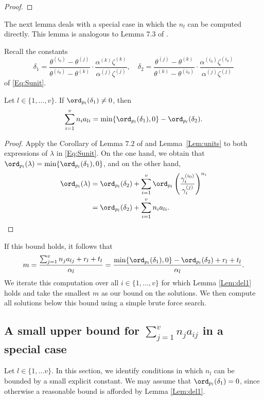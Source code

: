 {\begin{proof}
\end{proof}

The next lemma deals with a special case in which the $n_l$ can be computed directly. This lemma is analogous to Lemma 7.3 of \cite{TW3}. 

Recall the constants
\[\delta_1 = \frac{\theta^{(i_0)} - \theta^{(j)}}{\theta^{(i_0)} - \theta^{(k)}}\cdot\frac{\alpha^{(k)}\zeta^{(k)}}{\alpha^{(j)}\zeta^{(j)}}, \quad \delta_2 = \frac{\theta^{(j)} - \theta^{(k)}}{\theta^{(k)} - \theta^{(i_0)}}\cdot \frac{\alpha^{(i_0)}\zeta^{(i_0)}}{\alpha^{(j)}\zeta^{(j)}}\]
of \eqref{Eq:Sunit}.
\begin{lemma}\label{Lem:del1}
Let $l \in \{1, \dots, v\}$. If $\ord_{p_l}(\delta_1) \neq 0$, then 
\[ \sum_{i = 1}^v n_ia_{li} = \min\{\ord_{p_l}(\delta_1), 0\} - \ord_{p_l}(\delta_2).\]
\end{lemma}

\begin{proof}
Apply the Corollary of Lemma $7.2$ of \cite{TW3} and Lemma~\ref{Lem:units} to both expressions of $\lambda$ in \eqref{Eq:Sunit}. On the one hand, we obtain that $\ord_{p_l}(\lambda) = \min\{\ord_{p_l}(\delta_1), 0\}$, and on the other hand, 
\[\begin{split}
\ord_{p_l}(\lambda)
& = \ord_{p_l}(\delta_2) + \sum_{i = 1}^v \ord_{p_l}\left( \frac{\gamma_i^{(i_0)}}{\gamma_i^{(j)}}\right)^{n_i}\\
& = \ord_{p_l}(\delta_2) + \sum_{i = 1}^v n_ia_{li}.
\end{split}\]
\end{proof}

If this bound holds, it follows that
\[m = \frac{\sum_{j = 1}^{v}n_ja_{lj} + r_l + t_l}{\alpha_l} = \frac{\min\{\ord_{p_l}(\delta_1), 0\} - \ord_{p_l}(\delta_2) + r_l + t_l}{\alpha_l}. \]
We iterate this computation over all $i \in \{1, \dots, v \}$ for which Lemma \ref{Lem:del1} holds and take the smallest $m$ as our bound on the solutions. We then compute all solutions below this bound using a simple brute force search. 

\subsection{A small upper bound for $\sum_{j = 1}^v n_ja_{ij}$ in a special case} \label{subsec:smallbound}

Let $l \in \{1, \dots v\}$. In this section, we identify conditions in which $n_l$ can be bounded by a small explicit constant. We may assume that $\ord_{p_l}(\delta_1) = 0$, since otherwise a reasonable bound is afforded by Lemma \ref{Lem:del1}. 

}
